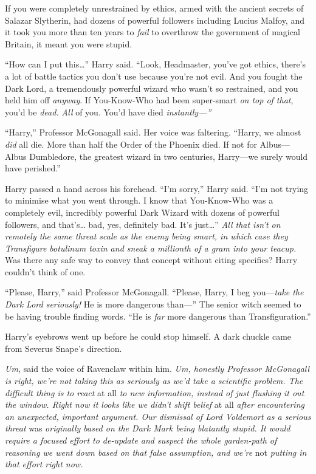 If you were completely unrestrained by ethics, armed with the ancient
secrets of Salazar Slytherin, had dozens of powerful followers including
Lucius Malfoy, and it took you more than ten years to \emph{fail} to
overthrow the government of magical Britain, it meant you were stupid.

``How can I put this\ldots{}'' Harry said. ``Look, Headmaster, you've
got ethics, there's a lot of battle tactics you don't use because you're
not evil. And you fought the Dark Lord, a tremendously powerful wizard
who wasn't so restrained, and you held him off \emph{anyway}. If
You-Know-Who had been super-smart \emph{on top of that}, you'd be
\emph{dead.} \emph{All} of you. You'd have died \emph{instantly---''}

``Harry,'' Professor McGonagall said. Her voice was faltering. ``Harry,
we almost \emph{did} all die. More than half the Order of the Phoenix
died. If not for Albus---Albus Dumbledore, the greatest wizard in two
centuries, Harry---we surely would have perished.''

Harry passed a hand across his forehead. ``I'm sorry,'' Harry said.
``I'm not trying to minimise what you went through. I know that
You-Know-Who was a completely evil, incredibly powerful Dark Wizard with
dozens of powerful followers, and that's\ldots{} bad, yes, definitely
bad. It's just\ldots{}'' \emph{All that isn't on remotely the same
threat scale as the enemy being smart, in which case they Transfigure
botulinum toxin and sneak a millionth of a gram into your teacup.} Was
there any safe way to convey that concept without citing specifics?
Harry couldn't think of one.

``Please, Harry,'' said Professor McGonagall. ``Please, Harry, I beg
you---\emph{take the Dark Lord seriously!} He is more dangerous
than---'' The senior witch seemed to be having trouble finding words.
``He is \emph{far} more dangerous than Transfiguration.''

Harry's eyebrows went up before he could stop himself. A dark chuckle
came from Severus Snape's direction.

\emph{Um,} said the voice of Ravenclaw within him. \emph{Um, honestly
Professor McGonagall is right, we're not taking this as seriously as
we'd take a scientific problem. The difficult thing is to react} at all
\emph{to new information, instead of just flushing it out the window.
Right now it looks like we didn't shift belief} at all \emph{after
encountering an unexpected, important argument. Our dismissal of Lord
Voldemort as a serious threat} was \emph{originally based on the Dark
Mark being blatantly stupid. It would require a focused effort to
de-update and suspect the whole garden-path of reasoning we went down
based on that false assumption, and we're} not \emph{putting in that
effort right now.}

